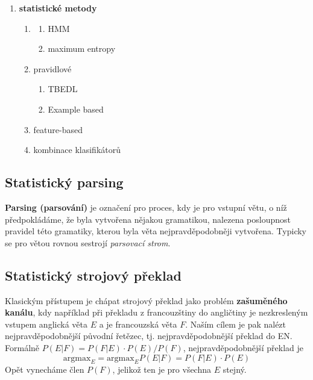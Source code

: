 \documentclass[11pt]{report} %
\numberwithin{equation}{section}
\begin{document}
\begin{enumerate}
	
	\item \textbf{statistické metody}
	\begin{enumerate}
		\item {}
		\begin{enumerate}
			\item HMM
			\item maximum entropy
		\end{enumerate}
		\item pravidlové
		\begin{enumerate}
			\item TBEDL
			\item Example based
		\end{enumerate}
		\item feature-based
		\item kombinace klasifikátorů
	\end{enumerate}
\end{enumerate}



\subsection{Statistický parsing}
\textbf{Parsing (parsování)} je označení pro proces, kdy je pro vstupní větu, o níž předpokládáme, že byla vytvořena nějakou gramatikou, nalezena posloupnost pravidel této gramatiky, kterou byla věta nejpravděpodobněji vytvořena. Typicky se pro větou rovnou sestrojí \textit{parsovací strom}.


\subsection{Statistický strojový překlad}
Klasickým přístupem je chápat strojový překlad jako problém \textbf{zašuměného kanálu}, kdy například při překladu z francouzštiny do angličtiny je nezkresleným vstupem anglická věta $E$ a  je francouzská věta $F$. Naším cílem je pak nalézt nejpravděpodobnější původní řetězec, tj. nejpravděpodobnější překlad do EN. Formálně $P(E|F) = P(F|E)\cdot P(E) / P(F)$, nejpravděpodobnější překlad je 
$$\text{argmax}_E = \text{argmax}_E P(E|F) = P(F|E)\cdot P(E)$$
Opět vynecháme člen $P(F)$, jelikož ten je pro všechna $E$ stejný.
\end{document}
